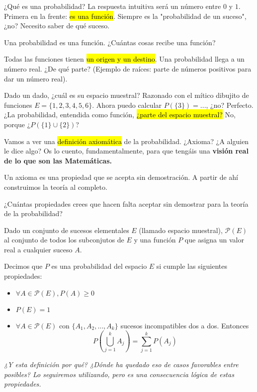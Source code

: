 {¿Qu\'e es una probabilidad? La respuesta intuitiva será un número entre $0$ y $1$. Primera en la frente: \hl{es una función}. Siempre es la "probabilidad de un suceso", ¿no? Necesito saber de qué suceso. 

Una probabilidad es una función. ¿Cuántas cosas recibe una función?

Todas las funciones tienen \hl{un origen y un destino}. Una probabilidad llega a un número real. ¿De qué parte? (Ejemplo de raíces: parte de números positivos para dar un número real).

Dado un dado, ¿cuál es su espacio muestral? Razonado con el mítico dibujito de funciones 
$E=\{1,2,3,4,5,6\}$. Ahora puedo calcular $P(\{3\}) = ...$, ¿no? Perfecto. ¿La probabilidad, entendida como función, \hl{¿parte del espacio muestral?} No, porque ¿$P(\{1\}\cup\{2\})$? 

Vamos a ver una \hl{definición axiomática} de la probabilidad. ¿Axioma? ¿A alguien le dice algo? Os lo cuento, fundamentalmente, para que tengáis una \textbf{visi\'on real de lo que son las Matemáticas.}}

Un axioma es una propiedad que se acepta sin demostración. A partir de ahí construimos la teoría al completo.

{¿Cuántas propiedades crees que hacen falta aceptar sin demostrar para la teoría de la probabilidad?}


\begin{defn}
Dado un conjunto de sucesos elementales $E$ (llamado espacio muestral), $\mathcal{P}(E)$ al conjunto de todos los subconjutos de $E$ y una función $P$ que asigna un valor real a cualquier suceso $A$.

Decimos que $P$ es una probabilidad del espacio $E$ si cumple las siguientes propiedades:

\begin{itemize}
	\item $\forall A\in \mathcal{P}(E), P(A)\geq 0$
	\item $P(E) = 1$
	\item $\forall A\in \mathcal{P}(E)$ con $\{A_1,A_2,..., A_k\}$ sucesos incompatibles dos a dos. Entonces \[ P\left(\bigcup_{j=1}^k A_j\right) = \sum_{j=1}^k P(A_j) \]
\end{itemize}
\end{defn}

\textit{¿Y esta definición por qué? ¿Dónde ha quedado eso de casos favorables entre posibles? Lo seguiremos utilizando, pero es una consecuencia lógica de estas propiedades.}

